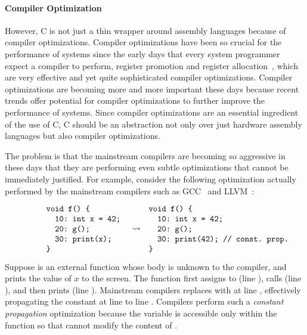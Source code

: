 \paragraph{Compiler Optimization}

However, C is not just a thin wrapper around assembly languages because of compiler optimizations.
Compiler optimizations have been so crucial for the performance of systems since the early days that
every system programmer expect a compiler to perform, \eg{} register promotion and register
allocation~\cite{reg-prom, reg-alloc}, which are very effective and yet quite sophisticated compiler
optimizations.  Compiler optimizations are becoming more and more important these days because
recent trends offer potential for compiler optimizations to further improve the performance of
systems.  Since compiler optimizations are an essential ingredient of the use of C, C should be an
abstraction not only over just hardware assembly languages but also compiler optimizations.



The problem is that the mainstream compilers are becoming so aggressive in these days that they are
performing even subtle optimizations that cannot be immediately justified.  For example, consider
the following optimization actually performed by the mainstream compilers such as GCC~\cite{gcc} and
LLVM~\cite{llvm}:

\[\begin{array}{rcl}
\begin{minipage}{0.27\textwidth}
\begin{verbatim}
void f() {
  10: int x = 42;
  20: g();
  30: print(x);
}
\end{verbatim}
\end{minipage}
&
\optarrow
&
\begin{minipage}{0.4\textwidth}
\begin{verbatim}
void f() {
  10: int x = 42;
  20: g();
  30: print(42); // const. prop.
}
\end{verbatim}
\end{minipage}
\end{array}\]

\noindent Suppose  is an external function whose body is unknown to the compiler, and
 prints the value of $x$ to the screen.  The function  first assigns
 to  (line ), calls  (line ), and then prints 
(line ).  Mainstream compilers replaces  with  at line ,
effectively propagating the constant  at line  to line .  Compilers
perform such a \emph{constant propagation} optimization because the variable  is accessible
only within the function  so that  cannot modify the content of .

